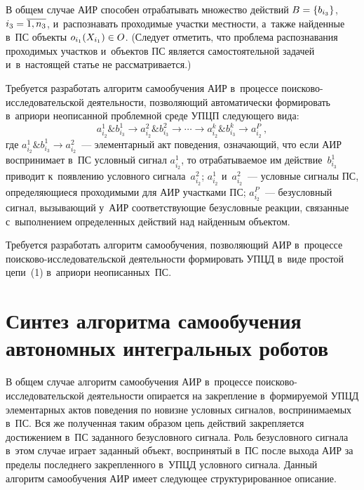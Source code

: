 \begin{multicols}{2}
  В общем случае АИР способен отрабатывать множество действий 
  $B\hm= \{ b_{i_3}\}$, $i_3\hm= \overline{1,n_3}$, и~распознавать 
проходимые участ\-ки мест\-ности, а~также найденные в~ПС
объекты $o_{i_1}(X_{i_1})\hm\in O$. (Следует отметить, что проб\-ле\-ма 
распознавания проходимых участков и~объектов ПС является 
самостоятельной задачей и~в~на\-сто\-ящей статье не рас\-смат\-ри\-ва\-ется.)
  
  Требуется разработать алгоритм самообучения АИР в~процессе  
по\-иско\-во-ис\-сле\-до\-ва\-тель\-ской деятельности, поз\-во\-ля\-ющий 
автоматически формировать в~априори неописанной проб\-лем\-ной среде УПЦП 
сле\-ду\-юще\-го вида: 
  \begin{equation}
  a^1_{i_2} \& b^1_{i_3} \to a^2_{i_2} \& b^2_{i_3} \to\cdots\to a^k_{i_2} 
  \& b^k_{i_3} \to a^P_{i_2}\,,
  \label{e1-kh}
  \end{equation}
где $a^1_{i_2}\& b^1_{i_3} \to a^2_{i_2}$~--- элементарный акт поведения, 
озна\-ча\-ющий, что если АИР воспринимает в~ПС условный сигнал 
$a^1_{i_2}$, то отрабатываемое им действие~$b^1_{i_3}$ приводит 
к~появлению условного сигнала~$a^2_{i_2}$; $a^1_{i_2}$ и~$a^2_{i_2}$~--- 
условные сигналы ПС, определяющиеся проходимыми для АИР 
участками ПС; $a^P_{i_2}$~--- безуслов\-ный сигнал, 
вызывающий у~АИР соответствующие безусловные реакции, связанные 
с~выполнением определенных действий над найденным объектом. 

  Требуется разработать алгоритм са\-мо\-обуче\-ния, поз\-во\-ля\-ющий АИР 
в~процессе по\-иско\-во-ис\-сле\-до\-ва\-тель\-ской де\-я\-тель\-ности формировать \mbox{УПЦД} 
в~виде прос\-той цепи~(1) в~априори неописанных~ПС.
  
\section{Синтез алгоритма самообучения автономных интегральных роботов}

  В общем случае алгоритм самообучения АИР в~процессе по\-ис\-ко\-во-ис\-сле\-до\-ва\-тель\-ской 
  де\-я\-тель\-ности опирается на за\-креп\-ле\-ние в~формируемой 
УПЦД элементарных актов поведения по новизне условных сигналов, 
воспринимаемых в~ПС. Вся же полученная таким образом цепь 
действий закрепляется достижением в~ПС заданного 
без\-услов\-но\-го сигнала. Роль безуслов\-но\-го сигнала в~этом случае играет 
заданный объект, воспринятый в~ПС после выхода АИР за пределы последнего 
за\-креп\-лен\-но\-го в~УПЦД условного сигнала. Данный алгоритм са\-мо\-обуче\-ния 
АИР имеет сле\-ду\-ющее структурированное описание. 
  

\end{multicols}
